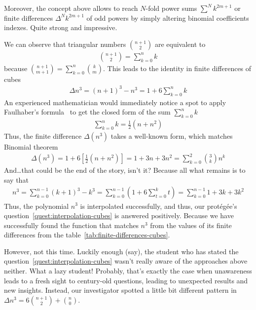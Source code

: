 Moreover, the concept above allows to reach $N$-fold power sums $\sum^N k^{2m+1}$
or finite differences $\Delta^N k^{2m+1}$ of odd powers by simply altering
binomial coefficients indexes.
Quite strong and impressive.

We can observe that triangular numbers $\binom{n+1}{2}$ are equivalent to
\begin{align*}
    \binom{n+1}{2} = \sum_{k=0}^{n} k
\end{align*}
because $\binom{n+1}{m+1} = \sum_{k=0}^{n} \binom{k}{m}$.
This leads to the identity in finite differences of cubes
\begin{align*}
    \Delta n^3 = (n+1)^3 - n^3 = 1 + 6 \sum_{k=0}^{n} k
\end{align*}
An experienced mathematician would immediately notice a spot to apply Faulhaber's formula~\cite{beardon1996sums}
to get the closed form of the sum $\sum_{k=0}^{n} k$
\begin{align*}
    \sum_{k=0}^{n} k = \frac{1}{2}(n+n^2)
\end{align*}
Thus, the finite difference $\Delta(n^3)$ takes a well-known form,
which matches Binomial theorem~\cite{abramowitz1988handbook}
\begin{align*}
    \Delta(n^3)
    = 1 + 6 \left[ \frac{1}{2}(n+n^2) \right]
    = 1 + 3 n + 3 n^2
    = \sum_{k=0}^{2} \binom{3}{k} n^k
\end{align*}
And\ldots that could be the end of the story, isn't it?
Because all what remains is to say that
\begin{align*}
    n^3
    = \sum_{k=0}^{n-1} (k+1)^3 - k^3
    = \sum_{k=0}^{n-1} \left( 1 + 6 \sum_{t=0}^{k} t \right)
    = \sum_{k=0}^{n-1} 1 + 3 k + 3 k^2
\end{align*}
Thus, the polynomial $n^3$ is interpolated successfully, and thus,
our protégée's question~\eqref{quest:interpolation-cubes} is answered positively.
Because we have successfully found the function that matches $n^3$ from the values of its finite differences from the
table~\eqref{tab:finite-differences-cubes}.

However, not this time.
Luckily enough (say), the student who has stated the question~\eqref{quest:interpolation-cubes}
wasn't really aware of the approaches above neither.
What a lazy student!
Probably, that's exactly the case when unawareness leads to a fresh sight to century-old questions,
leading to unexpected results and new insights.
Instead, our investigator spotted a little bit different pattern in $\Delta n^3= 6 \binom{n+1}{2} + \binom{n}{0}$.

